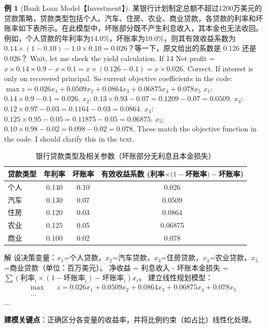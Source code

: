 \documentclass[12pt]{article}
\theoremstyle{plain}
\theoremstyle{definition}
\newtheorem{exm}{例}[subsection]
\newenvironment{slv}[1][解]{\begin{paragraph}{#1}\mbox{}}{\end{paragraph}\par\nopagebreak}
\begin{document}
\begin{exm}[Bank Loan Model【Investment】]
    某银行计划制定总额不超过1200万美元的贷款策略，贷款类型包括个人、汽车、住房、农业、商业贷款，各贷款的利率和坏账率如下表所示。在此模型中，坏账部分既不产生利息收入，其本金也无法收回。例如，个人贷款的年利率为14.0\%，坏账率为10.0\%，则其有效收益系数为 $0.14 \times (1 - 0.10) - 1.0 \times 0.10 = 0.026$？等一下，原文给出的系数是 0.126 还是 0.026？
    Wait, let me check the yield calculation.
    If 14%
    Net profit = $x \times 0.14 \times 0.9 - x \times 0.1 = x \times (0.126 - 0.1) = x \times 0.026$. Correct.
    If interest is only on recovered principal.
    So current objective coefficients in the code:
    $\max z=0.026x_1+0.0509x_2+0.0864x_3+0.06875x_4+0.078x_5$
    $x_1$: $0.14 \times 0.9 - 0.1 = 0.026$.
    $x_2$: $0.13 \times 0.93 - 0.07 = 0.1209 - 0.07 = 0.0509$.
    $x_3$: $0.12 \times 0.97 - 0.03 = 0.1164 - 0.03 = 0.0864$.
    $x_4$: $0.125 \times 0.95 - 0.05 = 0.11875 - 0.05 = 0.06875$.
    $x_5$: $0.10 \times 0.98 - 0.02 = 0.098 - 0.02 = 0.078$.
    These match the objective function in the code. I should clarify this in the text.

    \begin{table}[!htbp]
    \centering
    \caption{银行贷款类型及相关参数（坏账部分无利息且本金损失）}
    \begin{tabular}{lccc}
        \toprule
        贷款类型 & 年利率 & 坏账率 & 有效收益系数 (利率$\times(1-$坏账率$)-$坏账率) \\
        \midrule
        个人 & 0.140 & 0.10 & 0.026 \\
        汽车 & 0.130 & 0.07 & 0.0509 \\
        住房 & 0.120 & 0.03 & 0.0864 \\
        农业 & 0.125 & 0.05 & 0.06875 \\
        商业 & 0.100 & 0.02 & 0.078 \\
        \bottomrule
    \end{tabular}
    \end{table}

    \begin{slv}
    设决策变量：$x_1$=个人贷款，$x_2$=汽车贷款，$x_3$=住房贷款，$x_4$=农业贷款，$x_5$=商业贷款（单位：百万美元）。
    净收益 = 利息收入 - 坏账本金损失 = $\sum (\text{利率}_i \times (1 - \text{坏账率}_i) - \text{坏账率}_i) x_i$。
    建立线性规划模型：
    \begin{align*}
        \max \quad & z=0.026x_1+0.0509x_2+0.0864x_3+0.06875x_4+0.078x_5 \\
        ...
    \end{align*}
    ...
    \end{slv}
    \textbf{建模关键点}：正确区分各变量的收益率，并将比例约束（如占比）线性化处理。
\end{exm}
\end{document}
